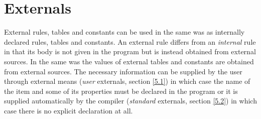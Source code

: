 \documentclass{article}
\let\oref\ref
\let\ref\oref
\begin{document}
\newpage
\section{Externals}\label{sec:5}

External rules, tables and constants can be used in the same was as
internally declared rules, tables and constants. An external rule differs
from an \emph{internal} rule in that its body is not given in the program
but is instead obtained from external sources. In the same was the values
of external tables and constants are obtained from external sources. The
necessary information can be supplied by the user through external means
(\emph{user} externals, section \ref{5.1}) in which case the name of the item and
some of its properties must be declared in the program or it is supplied
automatically by the compiler (\emph{standard} externals, section \ref{5.2}) in
which case there is no explicit declaration at all.
\end{document}

